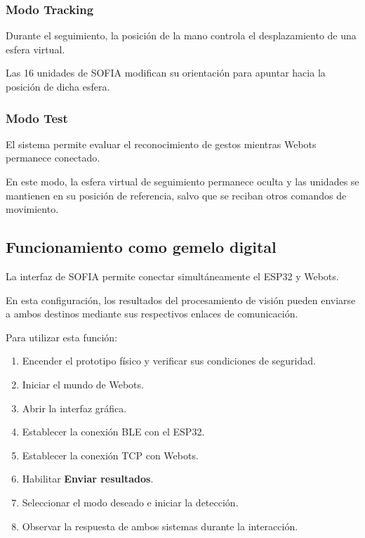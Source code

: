 \documentclass[letterpaper,journal]{IEEEtran}
\begin{document}
\subsubsection{Modo Tracking}

Durante el seguimiento, la posición
de la mano controla el desplazamiento
de una esfera virtual.

Las 16 unidades de SOFIA modifican
su orientación para apuntar hacia
la posición de dicha esfera.

\subsubsection{Modo Test}

El sistema permite evaluar el
reconocimiento de gestos mientras
Webots permanece conectado.

En este modo, la esfera virtual
de seguimiento permanece oculta
y las unidades se mantienen
en su posición de referencia,
salvo que se reciban otros
comandos de movimiento.

\subsection{Funcionamiento como gemelo digital}

La interfaz de SOFIA permite conectar
simultáneamente el ESP32 y Webots.

En esta configuración, los resultados
del procesamiento de visión pueden
enviarse a ambos destinos mediante
sus respectivos enlaces de comunicación.

Para utilizar esta función:

\begin{enumerate}
    \item Encender el prototipo físico
    y verificar sus condiciones de seguridad.

    \item Iniciar el mundo de Webots.

    \item Abrir la interfaz gráfica.

    \item Establecer la conexión BLE
    con el ESP32.

    \item Establecer la conexión TCP
    con Webots.

    \item Habilitar
    \textbf{Enviar resultados}.

    \item Seleccionar el modo deseado
    e iniciar la detección.

    \item Observar la respuesta de ambos
    sistemas durante la interacción.
\end{enumerate}
\end{document}
